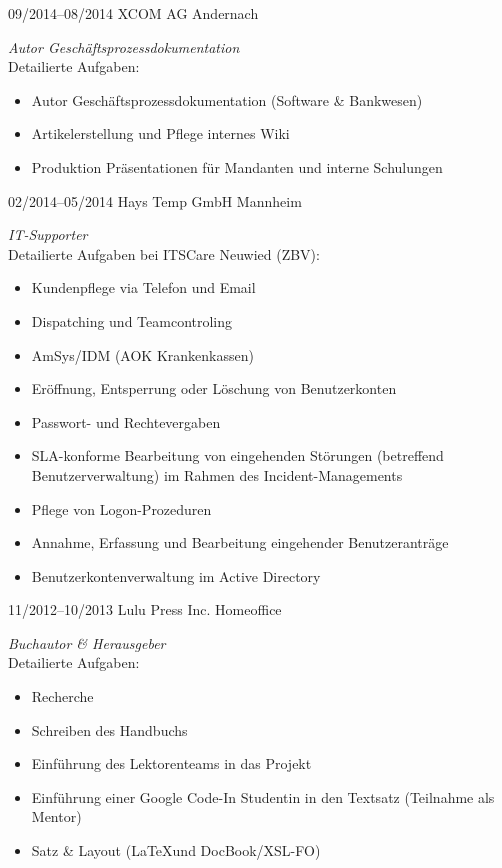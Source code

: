 \documentclass[a4paper,latin]{friggeri-cv} %
\begin{document}
\begin{entrylist}
\entry
{09/2014--08/2014}
{XCOM AG}
{Andernach}
{\emph{Autor Geschäftsprozessdokumentation} \\
	Detailierte Aufgaben:
	\begin{itemize}
		\item Autor Geschäftsprozessdokumentation (Software  \& Bankwesen)
		\item Artikelerstellung und Pflege internes Wiki
		\item Produktion Präsentationen für Mandanten und interne Schulungen
	\end{itemize}
}
\entry
{02/2014--05/2014}
{Hays Temp GmbH}
{Mannheim}
{\emph{IT-Supporter} \\
Detailierte Aufgaben bei ITSCare Neuwied (ZBV):
\begin{itemize}
\item Kundenpflege via Telefon und Email
\item Dispatching und Teamcontroling
\item AmSys/IDM (AOK Krankenkassen)
\item Eröffnung, Entsperrung oder Löschung von Benutzerkonten
\item Passwort- und Rechtevergaben
\item SLA-konforme Bearbeitung von eingehenden Störungen (betreffend Benutzerverwaltung) im Rahmen des Incident-Managements
\item Pflege von Logon-Prozeduren
\item Annahme, Erfassung und Bearbeitung eingehender Benutzeranträge
\item Benutzerkontenverwaltung im Active Directory
\end{itemize}
}
\entry
{11/2012--10/2013}
{Lulu Press Inc.}
{Homeoffice}
{\emph{Buchautor \& Herausgeber}\\
Detailierte Aufgaben:
\begin{itemize}
\item Recherche
\item Schreiben des Handbuchs
\item Einführung des Lektorenteams in das Projekt
\item Einführung einer Google Code-In Studentin in den Textsatz (Teilnahme als Mentor)
\item Satz \& Layout (\LaTeX und DocBook/XSL-FO)
\end{itemize}
}
\end{entrylist}
\end{document}
